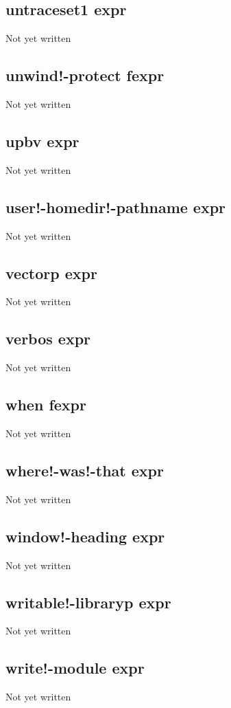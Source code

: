 \documentclass[a4paper,11pt]{article}
\begin{document}
{\subsection{\ttfamily untraceset1 expr}
Not yet written

\subsection{\ttfamily unwind!-protect fexpr}
Not yet written

\subsection{\ttfamily upbv expr}
Not yet written

\subsection{\ttfamily user!-homedir!-pathname expr}
Not yet written

\subsection{\ttfamily vectorp expr}
Not yet written

\subsection{\ttfamily verbos expr}
Not yet written

\subsection{\ttfamily when fexpr}
Not yet written

\subsection{\ttfamily where!-was!-that expr}
Not yet written

\subsection{\ttfamily window!-heading expr}
Not yet written

\subsection{\ttfamily writable!-libraryp expr}
Not yet written

\subsection{\ttfamily write!-module expr}
Not yet written

}
\end{document}
